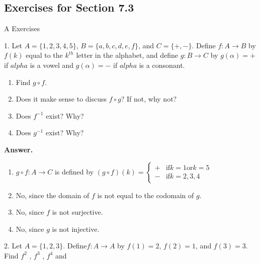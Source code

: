 \documentclass[10pt,]{book}
\theoremstyle{plain}
\theoremstyle{definition}
\theoremstyle{definition}
\theoremstyle{definition}
\begin{document}
\subsection[Exercises for Section 7.3 ]{Exercises for Section 7.3 }\label{exercises-7-3}
\hypertarget{exercisegroup-5}{}\typeout{************************************************}
\typeout{************************************************}
A Exercises%
\begin{exercisegroup}
\item[1.]\hypertarget{exercise-23}{}Let \(A = \{1,2, 3, 4, 5\}\), \(B = \{a, b, c, d, e,f\}\), and \(C = \{+, -\}\). Define \(f: A \to  B\) by \(f(k)\) equal to the \(k^{th}\)
letter in the alphabet, and define \(g : B \rightarrow  C\) by \(g(\alpha ) = +\) \textrm{ if }\(alpha\) is a vowel and \(g(\alpha ) = -\) \textrm{ if } \textit{
\(alpha\)} is a consonant.%
\par
\leavevmode%
\begin{enumerate}[label=\alph*]
\item\hypertarget{li-70}{} Find \(g\circ  f\).%
\item\hypertarget{li-71}{} Does it make sense to discuss \(f\circ g\)? If not, why not?%
\item\hypertarget{li-72}{} Does \(f^{-1}\) exist? Why?%
\item\hypertarget{li-73}{} Does \(g^{-1}\) exist? Why?%
\end{enumerate}
%
\par\smallskip
\par\smallskip
\noindent\textbf{Answer.}\hypertarget{answer-11}{}\quad
\leavevmode%
\begin{enumerate}[label=\alph*]
\item\hypertarget{li-74}{}  \(g\circ f:A\to C\) is defined by \((g\circ f)(k)=\begin{cases}
 + & \text{if} k=1 \text{or} k=5 \\
 - & \text{if} k=2,3,4
\end{cases}\)%
\item\hypertarget{li-75}{} No, since the domain of \(f\) is not equal to the codomain of \(g\).%
\item\hypertarget{li-76}{} No, since \(f\) is not surjective.%
\item\hypertarget{li-77}{} No, since \(g\) is not injective.%
\end{enumerate}
%
\item[2.]\hypertarget{exercise-24}{} Let \(A = \{1, 2, 3\}\). Define\(f:A\rightarrow A\) by \(f(1) = 2\), \(f(2) = 1\), and \(f(3) = 3\). Find \(f^2\) , \(f^3\) , \(f^4\) and

\end{exercisegroup}
\end{document}
